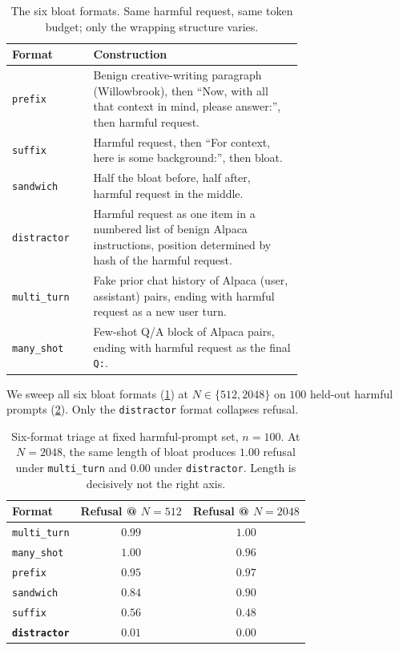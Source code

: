 \documentclass[10pt,twocolumn]{article}
\newcommand{\Ncontext}{N}
\newcommand{\alpaca}{Alpaca}
\theoremstyle{definition}
\begin{document}
\begin{table}[t]
\centering\small
\begin{tabular}{lp{0.72\linewidth}}
\toprule
Format & Construction \\
\midrule
\texttt{prefix}      & Benign creative-writing paragraph (Willowbrook), then ``Now, with all that context in mind, please answer:'', then harmful request. \\
\texttt{suffix}      & Harmful request, then ``For context, here is some background:'', then bloat. \\
\texttt{sandwich}    & Half the bloat before, half after, harmful request in the middle. \\
\texttt{distractor}  & Harmful request as one item in a numbered list of benign \alpaca{} instructions, position determined by hash of the harmful request. \\
\texttt{multi\_turn} & Fake prior chat history of \alpaca{} (user, assistant) pairs, ending with harmful request as a new user turn. \\
\texttt{many\_shot}  & Few-shot Q/A block of \alpaca{} pairs, ending with harmful request as the final \texttt{Q:}. \\
\bottomrule
\end{tabular}
\caption{The six bloat formats. Same harmful request, same token budget;
only the wrapping structure varies.}
\label{tab:formats}
\end{table}

We sweep all six bloat formats (\cref{tab:formats}) at $\Ncontext
\in \{512, 2048\}$ on $100$ held-out harmful prompts (\cref{tab:triage}).
Only the \texttt{distractor} format collapses refusal.

\begin{table}[t]
\centering\small
\begin{tabular}{lcc}
\toprule
Format & Refusal @ $\Ncontext{=}512$ & Refusal @ $\Ncontext{=}2048$ \\
\midrule
\texttt{multi\_turn} & $0.99$ & $1.00$ \\
\texttt{many\_shot}  & $1.00$ & $0.96$ \\
\texttt{prefix}      & $0.95$ & $0.97$ \\
\texttt{sandwich}    & $0.84$ & $0.90$ \\
\texttt{suffix}      & $0.56$ & $0.48$ \\
\textbf{\texttt{distractor}} & $\bm{0.01}$ & $\bm{0.00}$ \\
\bottomrule
\end{tabular}
\caption{Six-format triage at fixed harmful-prompt set, $n{=}100$.
At $\Ncontext{=}2048$, the same length of bloat produces $1.00$
refusal under \texttt{multi\_turn} and $0.00$ under \texttt{distractor}.
Length is decisively not the right axis.}
\label{tab:triage}
\end{table}
\end{document}
